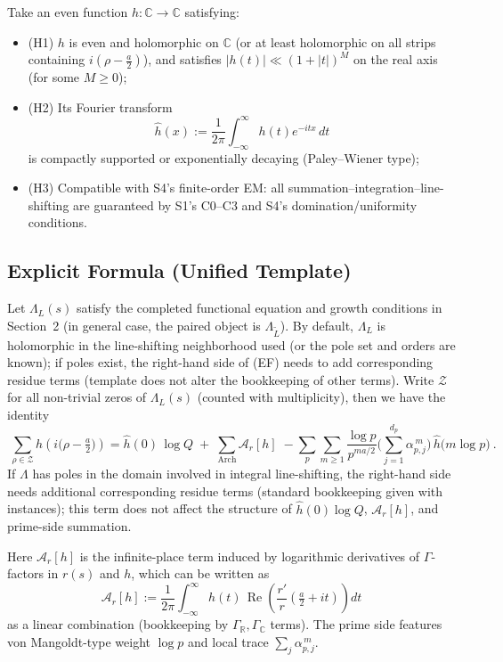 \documentclass[11pt,a4paper]{article}
\theoremstyle{remark}
\DeclareMathOperator{\Re}{Re}
\begin{document}
Take an even function $h:\mathbb{C}\to\mathbb{C}$ satisfying:
\begin{itemize}
\item (H1) $h$ is even and holomorphic on $\mathbb{C}$ (or at least holomorphic on all strips containing $i(\rho-\frac{a}{2})$), and satisfies $|h(t)|\ll (1+|t|)^M$ on the real axis (for some $M\ge 0$);

\item (H2) Its Fourier transform
\begin{equation}
\widehat{h}(x):=\frac{1}{2\pi}\int_{-\infty}^{\infty} h(t)e^{-itx}\,dt
\end{equation}
is compactly supported or exponentially decaying (Paley--Wiener type);

\item (H3) Compatible with S4's finite-order EM: all summation--integration--line-shifting are guaranteed by S1's C0--C3 and S4's domination/uniformity conditions.
\end{itemize}

\subsection{Explicit Formula (Unified Template)}

Let $\Lambda_{L}(s)$ satisfy the completed functional equation and growth conditions in Section~2 (in general case, the paired object is $\Lambda_{\tilde{L}}$). By default, $\Lambda_{L}$ is holomorphic in the line-shifting neighborhood used (or the pole set and orders are known); if poles exist, the right-hand side of (EF) needs to add corresponding residue terms (template does not alter the bookkeeping of other terms). Write $\mathcal{Z}$ for all non-trivial zeros of $\Lambda_{L}(s)$ (counted with multiplicity), then we have the identity
\begin{equation}
\boxed{\
\sum_{\rho\in\mathcal{Z}} h\!\left(i\big(\rho-\tfrac{a}{2}\big)\right)
= \widehat{h}(0)\,\log Q\;+\;\sum_{\text{Arch}}\mathcal{A}_{r}[h]\;-
\sum_{p}\sum_{m\ge1}\frac{\log p}{p^{m a/2}}\Big(\sum_{j=1}^{d_p}\alpha_{p,j}^{\,m}\Big)\,\widehat{h}\!\big(m\log p\big)\ .
}
\tag{EF}
\end{equation}
If $\Lambda$ has poles in the domain involved in integral line-shifting, the right-hand side needs additional corresponding residue terms (standard bookkeeping given with instances); this term does not affect the structure of $\widehat{h}(0)\log Q$, $\mathcal{A}_r[h]$, and prime-side summation.

Here $\mathcal{A}_{r}[h]$ is the infinite-place term induced by logarithmic derivatives of $\Gamma$-factors in $r(s)$ and $h$, which can be written as
\begin{equation}
\mathcal{A}_{r}[h]
:=\frac{1}{2\pi}\int_{-\infty}^{\infty}h(t)\,\Re\!\left(\frac{r'}{r}\!\left(\tfrac{a}{2}+it\right)\right)dt
\end{equation}
as a linear combination (bookkeeping by $\Gamma_{\mathbb{R}},\Gamma_{\mathbb{C}}$ terms). The prime side features von Mangoldt-type weight $\log p$ and local trace $\sum_j\alpha_{p,j}^{\,m}$.
\end{document}
